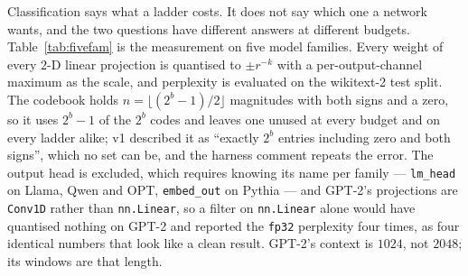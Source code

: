 \documentclass[11pt]{article}
\theoremstyle{definition}
\begin{document}
Classification says what a ladder costs. It does not say which one a network
wants, and the two questions have different answers at different budgets.
Table~\ref{tab:fivefam} is the measurement on five model families. Every weight
of every $2$-D linear projection is quantised to $\pm r^{-k}$ with a
per-output-channel maximum as the scale, and perplexity is evaluated on the
wikitext-2 test split. The codebook holds $n=\lfloor(2^{b}-1)/2\rfloor$
magnitudes with both signs and a zero, so it uses $2^{b}-1$ of the $2^{b}$
codes and leaves one unused at every budget and on every ladder alike; v1
described it as ``exactly $2^{b}$ entries including zero and both signs'', which
no set can be, and the harness comment repeats the error. The output head is
excluded, which requires knowing its name per family --- \texttt{lm\_head} on
Llama, Qwen and OPT, \texttt{embed\_out} on Pythia --- and GPT-2's projections
are \texttt{Conv1D} rather than \texttt{nn.Linear}, so a filter on
\texttt{nn.Linear} alone would have quantised nothing on GPT-2 and reported the
\texttt{fp32} perplexity four times, as four identical numbers that look like a
clean result. GPT-2's context is $1024$, not $2048$; its windows are that
length.
\end{document}
